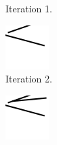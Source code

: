 \begin{figure}
\begin{subfigure}{.15\textwidth}
        \caption{Iteration 1.}
    \end{subfigure}
    \begin{subfigure}{.15\textwidth}
        \includegraphics[width=\textwidth]{graphics/work-artifacts/iterative/full/2/process/test-1.png}
        \caption{Iteration 2.}
    \end{subfigure}
    \begin{subfigure}{.15\textwidth}
        \includegraphics[width=\textwidth]{graphics/work-artifacts/iterative/full/2/process/test-2.png}

\end{subfigure}
\end{figure}
